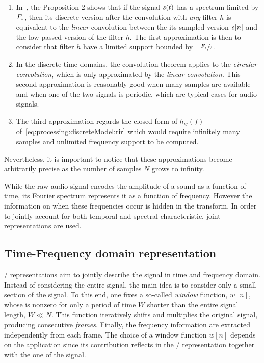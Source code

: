 \begin{enumerate}
    \item\label{en:processing:dft:approx1}
    In~, the Proposition 2 shows that if the signal $s(t)$ has a spectrum limited by $F_s$, then its discrete version after the convolution with \textit{any} filter $h$
    is equivalent to the \textit{linear} convolution between the its sampled version $s[n]$ and the low-passed version of the filter $h$.
    The first approximation is then to consider that filter $h$ have a limited support bounded by $\pm \sfrac{F_s}{2}$.
    \item\label{en:processing:dft:approx2}
    In the discrete time domains, the convolution theorem applies to the \textit{circular convolution}, which is only approximated by the \textit{linear convolution}.
    This second approximation is reasonably good when many samples are available and when one of the two signals is periodic, which
    are typical cases for audio signals.
    \item\label{en:processing:dft:approx3}
    The third approximation regards the closed-form of $h_{ij}(f)$ of~\cref{eq:processing:discreteModel:rir} which
    would require infinitely many samples and unlimited frequency support to be computed.
\end{enumerate}

Nevertheless, it is important to notice that these approximations become arbitrarily precise as the number of samples $N$ grows to infinity.

While the raw audio signal encodes the amplitude of a sound as a function of time,
its Fourier spectrum represents it as a function of frequency.
However the information on when these frequencies occur is hidden in the transform.
In order to jointly account for both temporal and spectral characteristic, joint representations are used.

\subsection{Time-Frequency domain representation}
\TFdef/ representations aim to jointly describe the signal in time and frequency domain.
Instead of considering the entire signal, the main idea is to consider only a small section of the signal.
To this end, one fixes a so-called \textit{window} function, $w[n]$, whose is nonzero for only a period of time $W$ shorter than
the entire signal length, $W \ll N$.
This function iteratively shifts and multiplies the original signal, producing consecutive \textit{frames}.
Finally, the frequency information are extracted independently from each frame.
The choice of a window function $w[n]$ depends on the application since its contribution reflects in the \TF/ representation together with the
one of the signal.

